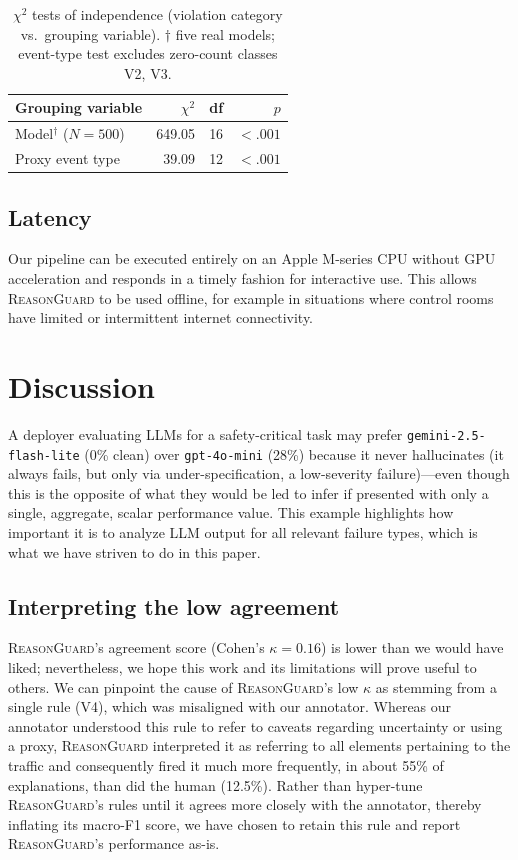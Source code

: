 \documentclass[conference]{IEEEtran}
\newcommand{\rg}{\textsc{ReasonGuard}}
\begin{document}
\begin{table}[t]
\centering
\caption{$\chi^2$ tests of independence (violation category vs.\ grouping variable). $\dagger$ five real models; event-type test excludes zero-count classes V2, V3.}
\label{tab:chi2}
\begin{tabular}{@{}lrrr@{}}
\toprule
Grouping variable & $\chi^2$ & df & $p$ \\
\midrule
Model$^{\dagger}$ ($N{=}500$) & 649.05 & 16 & $<.001$ \\
Proxy event type              & 39.09  & 12 & $<.001$ \\
\bottomrule
\end{tabular}
\end{table}

\subsection{Latency}
Our pipeline can be executed entirely on an Apple M-series CPU without GPU acceleration and responds in a timely fashion for interactive use. This allows \rg{} to be used offline, for example in situations where control rooms have limited or intermittent internet connectivity.

\section{Discussion}\label{sec:discussion}

A deployer evaluating LLMs for a safety-critical task may prefer \texttt{gemini-2.5-flash-lite} (0\% clean) over \texttt{gpt-4o-mini} (28\%) because it never hallucinates (it always fails, but only via under-specification, a low-severity failure)---even though this is the opposite of what they would be led to infer if presented with only a single, aggregate, scalar performance value. This example highlights how important it is to analyze LLM output for all relevant failure types, which is what we have striven to do in this paper.

\subsection{Interpreting the low agreement}
\rg's agreement score (Cohen's $\kappa = 0.16$) is lower than we would have liked; nevertheless, we hope this work and its limitations will prove useful to others. We can pinpoint the cause of \rg's low $\kappa$ as stemming from a single rule (V4), which was misaligned with our annotator. Whereas our annotator understood this rule to refer to caveats regarding uncertainty or using a proxy, \rg{} interpreted it as referring to all elements pertaining to the traffic and consequently fired it much more frequently, in about 55\% of explanations, than did the human (12.5\%). Rather than hyper-tune \rg's rules until it agrees more closely with the annotator, thereby inflating its macro-F1 score, we have chosen to retain this rule and report \rg's performance as-is.
\end{document}
